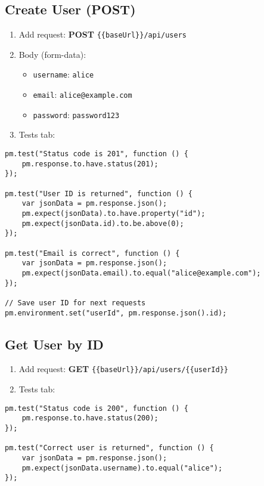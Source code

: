 \documentclass[12pt,a4paper]{article}
\begin{document}
\subsection{Create User (POST)}

\begin{enumerate}
    \item Add request: \textbf{POST} \texttt{\{\{baseUrl\}\}/api/users}
    \item Body (form-data):
    \begin{itemize}
        \item \texttt{username}: \texttt{alice}
        \item \texttt{email}: \texttt{alice@example.com}
        \item \texttt{password}: \texttt{password123}
    \end{itemize}
    \item Tests tab:
\end{enumerate}

\begin{lstlisting}[caption=Postman Test - Create User]
pm.test("Status code is 201", function () {
    pm.response.to.have.status(201);
});

pm.test("User ID is returned", function () {
    var jsonData = pm.response.json();
    pm.expect(jsonData).to.have.property("id");
    pm.expect(jsonData.id).to.be.above(0);
});

pm.test("Email is correct", function () {
    var jsonData = pm.response.json();
    pm.expect(jsonData.email).to.equal("alice@example.com");
});

// Save user ID for next requests
pm.environment.set("userId", pm.response.json().id);
\end{lstlisting}

\subsection{Get User by ID}

\begin{enumerate}
    \item Add request: \textbf{GET} \texttt{\{\{baseUrl\}\}/api/users/\{\{userId\}\}}
    \item Tests tab:
\end{enumerate}

\begin{lstlisting}[caption=Postman Test - Get User by ID]
pm.test("Status code is 200", function () {
    pm.response.to.have.status(200);
});

pm.test("Correct user is returned", function () {
    var jsonData = pm.response.json();
    pm.expect(jsonData.username).to.equal("alice");
});
\end{lstlisting}
\end{document}
